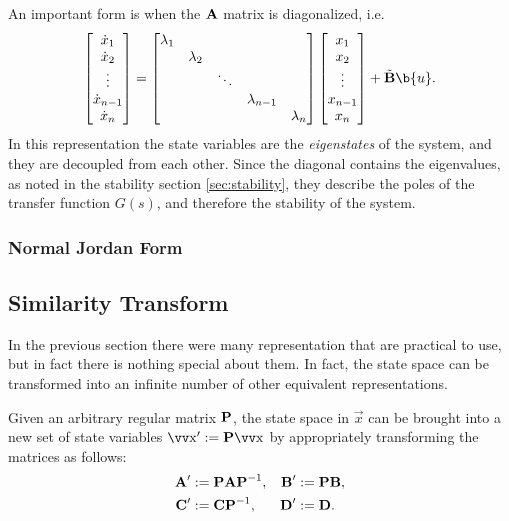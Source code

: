 An important form is when the \(\bm{\mathrm{A}}\) matrix is diagonalized, i.e.
\[
	\begin{bmatrix}
		\dot{x}_1 \\ \dot{x}_2 \\ \vdots \\ \dot{x}_{n-1} \\ \dot{x}_n
	\end{bmatrix}
	=
	\begin{bmatrix}
		\lambda_1 \\
		& \lambda_2 \\
		& & \ddots \\
		& & & \lambda_{n-1} \\
		& & & & \lambda_n
	\end{bmatrix}
	\begin{bmatrix}
		x_1 \\ x_2 \\ \vdots \\ x_{n-1} \\ x_n
	\end{bmatrix}
	+
	\tilde{\mx{B}}\b{u}.
\]
In this representation the state variables are the \emph{eigenstates} of the system, and they are decoupled from each other. Since the diagonal contains the eigenvalues, as noted in the stability section \ref{sec:stability}, they describe the poles of the transfer function \(G(s)\), and therefore the stability of the system.

\subsubsection{Normal Jordan Form}

\subsection{Similarity Transform}

In the previous section there were many representation that are practical to use, but in fact there is nothing special about them. In fact, the state space can be transformed into an infinite number of other equivalent representations.

Given an arbitrary regular matrix \(\bm{\mathrm{P}}\), the state space in \(\vec{x}\) can be brought into a new set of state variables \(\vec{x}' := \mx{P} \vec{x}\) by appropriately transforming the matrices as follows:
\begin{align*}
	\bm{\mathrm{A}}' &:= \bm{\mathrm{P}} \bm{\mathrm{A}} \bm{\mathrm{P}}^{-1}, &
	\bm{\mathrm{B}}'	&:= \bm{\mathrm{P}} \bm{\mathrm{B}}, \\
	\bm{\mathrm{C}}' &:= \bm{\mathrm{C}} \bm{\mathrm{P}}^{-1}, &
	\bm{\mathrm{D}}' &:= \bm{\mathrm{D}}.
\end{align*}

